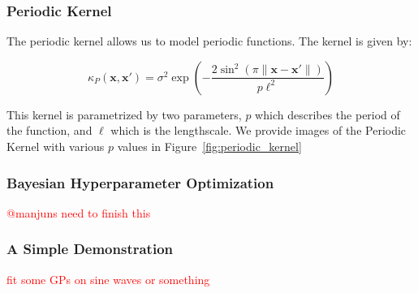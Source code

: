 \documentclass[pdf]{beamer}
\newcommand{\bx}{\boldsymbol{x}}
\newcommand{\todo}[1]{\textcolor{red}{#1}}
\begin{document}
\begin{frame}
  \frametitle{Periodic Kernel}
The periodic kernel allows us to model periodic functions. The kernel is given by:

\[
  \kappa_{P}(\bx, \bx') = \sigma^{2}  \exp(- \frac{2 \sin^{2}(\pi \|\bx - \bx'\|)}{p \ell^{2}})
\]

This kernel is parametrized by two parameters, $p$ which describes the period of the function, and $\ell$ which is the
lengthscale\cite{duvenaud_automatic_2014}. We provide images of the Periodic Kernel with various $p$ values in
Figure~\ref{fig:periodic_kernel}
\end{frame}
\begin{frame}
  \frametitle{Bayesian Hyperparameter Optimization}
  \todo{@manjuns need to finish this}
\end{frame}

\begin{frame}
  \frametitle{A Simple Demonstration}

\todo{fit some GPs on sine waves or something}
\end{frame}
\end{document}
